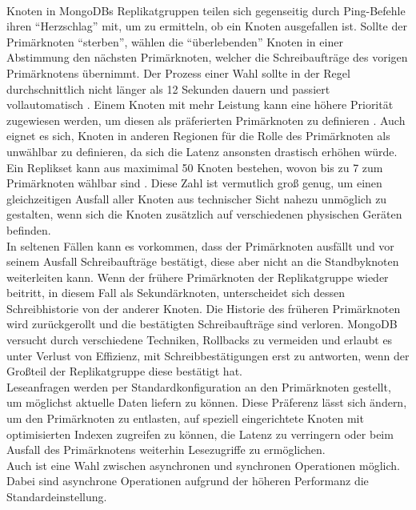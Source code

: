 \paragraph{}
Knoten in MongoDBs Replikatgruppen teilen sich gegenseitig durch Ping-Befehle ihren \enquote{Herzschlag} mit, um zu ermitteln, ob ein Knoten ausgefallen ist.
Sollte der Primärknoten \enquote{sterben}, wählen die \enquote{überlebenden} Knoten in einer Abstimmung den nächsten Primärknoten, welcher die Schreibaufträge des vorigen Primärknotens übernimmt.
Der Prozess einer Wahl sollte in der Regel durchschnittlich nicht länger als 12 Sekunden dauern und passiert vollautomatisch \cite{db:mongoElectionTimeout}.
Einem Knoten mit mehr Leistung kann eine höhere Priorität zugewiesen werden, um diesen als präferierten Primärknoten zu definieren \cite{db:mongoElectionPriority}.
Auch eignet es sich, Knoten in anderen Regionen für die Rolle des Primärknoten als unwählbar zu definieren, da sich die Latenz ansonsten drastisch erhöhen würde.
Ein Replikset kann aus maximimal 50 Knoten bestehen, wovon bis zu 7 zum Primärknoten wählbar sind \cite{db:mongoReplicaSetMembersLimit}.
Diese Zahl ist vermutlich groß genug, um einen gleichzeitigen Ausfall aller Knoten aus technischer Sicht nahezu unmöglich zu gestalten, wenn sich die Knoten zusätzlich auf verschiedenen physischen Geräten befinden.\\
In seltenen Fällen kann es vorkommen, dass der Primärknoten ausfällt und vor seinem Ausfall Schreibaufträge bestätigt, diese aber nicht an die Standbyknoten weiterleiten kann. Wenn der frühere Primärknoten der Replikatgruppe wieder beitritt, in diesem Fall als Sekundärknoten, unterscheidet sich dessen Schreibhistorie von der anderer Knoten. Die Historie des früheren Primärknoten wird zurückgerollt und die bestätigten Schreibaufträge sind verloren. 
MongoDB versucht durch verschiedene Techniken, Rollbacks zu vermeiden und erlaubt es unter Verlust von Effizienz, mit Schreibbestätigungen erst zu antworten, wenn der Großteil der Replikatgruppe diese bestätigt hat. \cite{db:mongoRollback}\\
Leseanfragen werden per Standardkonfiguration an den Primärknoten gestellt, um möglichst aktuelle Daten liefern zu können.
Diese Präferenz lässt sich ändern, um den Primärknoten zu entlasten, auf speziell eingerichtete Knoten mit optimisierten Indexen zugreifen zu können, die Latenz zu verringern oder beim Ausfall des Primärknotens weiterhin Lesezugriffe zu ermöglichen. \\
Auch ist eine Wahl zwischen asynchronen und synchronen Operationen möglich.
Dabei sind asynchrone Operationen aufgrund der höheren Performanz die Standardeinstellung.


